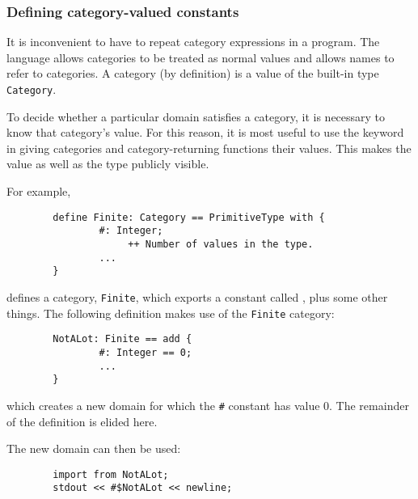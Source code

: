 {%
\subsubsection{Defining category-valued constants}

It is inconvenient to have to repeat category expressions in
a program.  The language allows categories to be treated as normal values
and allows names to refer to categories.
A category (by definition) is a value of the \asharp{} built-in type
{\tt Category}. 

%
To decide whether a particular domain satisfies a category, it is necessary
to know that category's value.   For this reason, it is most useful
to use the  keyword in giving categories and category-returning
functions their values.   This makes the value as well as the type
publicly visible.

For example, 

\begin{small}
\begin{verbatim}
        define Finite: Category == PrimitiveType with {
                #: Integer;
                     ++ Number of values in the type.
                ...
        }
\end{verbatim}
\end{small}

defines a category, {\tt Finite}, which exports a constant called
\ttin{\#}, plus some
other things. 
The following definition makes use of the {\tt Finite} category:

\begin{small}
\begin{verbatim}
        NotALot: Finite == add {
                #: Integer == 0;
                ...
        }
\end{verbatim}
\end{small}

which creates a new domain  for which the {\tt \#}
constant has value 0. The remainder of the definition is
elided here.

The new domain can then be used:

\begin{small}
\begin{verbatim}
        import from NotALot;
        stdout << #$NotALot << newline;
\end{verbatim}
\end{small}

}
